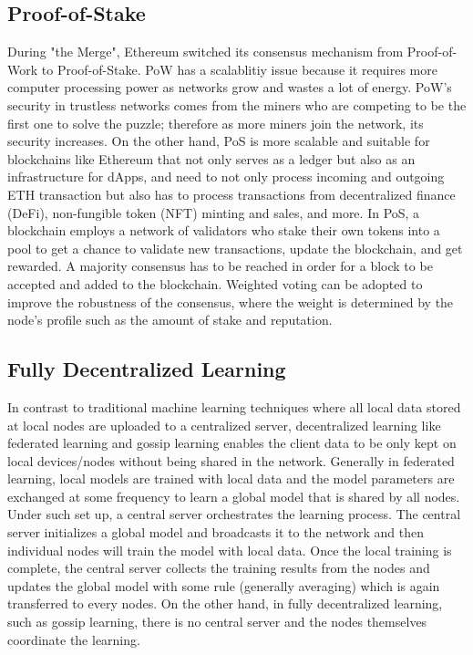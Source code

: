 \documentclass[11pt,letterpaper]{article}
\begin{document}
\subsection{Proof-of-Stake}
During "the Merge", Ethereum switched its consensus mechanism from Proof-of-Work to Proof-of-Stake. PoW has a scalablitiy issue because it requires more computer processing power as networks grow and wastes a lot of energy. PoW's security in trustless networks comes from the miners who are competing to be the first one to solve the puzzle; therefore as more miners join the network, its security increases. On the other hand, PoS is more scalable and suitable for blockchains like Ethereum that not only serves as a ledger but also as an infrastructure for dApps, and need to not only process incoming and outgoing ETH transaction but also has to process transactions from decentralized finance (DeFi), non-fungible token (NFT) minting and sales, and more. In PoS, a blockchain employs a network of validators who stake their own tokens into a pool to get a chance to validate new transactions, update the blockchain, and get rewarded. A majority consensus has to be reached in order for a block to be accepted and added to the blockchain. Weighted voting can be adopted to improve the robustness of the consensus, where the weight is determined by the node's profile such as the amount of stake and reputation.

\subsection{Fully Decentralized Learning}
In contrast to traditional machine learning techniques where all local data stored at local nodes are uploaded to a centralized server, decentralized learning like federated learning and gossip learning enables the client data to be only kept on local devices/nodes without being shared in the network. Generally in federated learning, local models are trained with local data and the model parameters are exchanged at some frequency to learn a global model that is shared by all nodes. Under such set up, a central server orchestrates the learning process. The central server initializes a global model and broadcasts it to the network and then individual nodes will train the model with local data. Once the local training is complete, the central server collects the training results from the nodes and updates the global model with some rule (generally averaging) which is again transferred to every nodes. On the other hand, in fully decentralized learning, such as gossip learning, there is no central server and the nodes themselves coordinate the learning.
\end{document}
